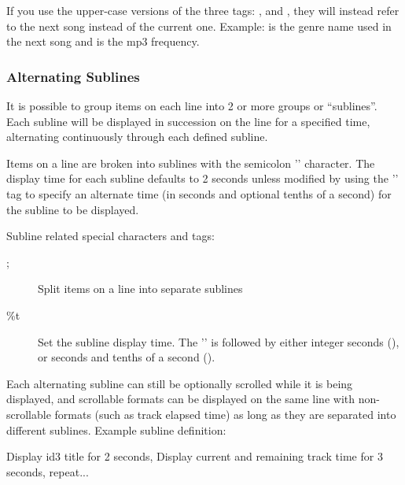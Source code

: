 If you use the upper-case versions of the
three tags: ,  and , they will instead refer to 
the next song instead of the current one. Example:  is the genre 
name used in the next song and  is the mp3 frequency.


\subsubsection{Alternating Sublines}

It is possible to group items on each line into 2 or more groups or 
``sublines''. Each subline will be displayed in succession on the line for a 
specified time, alternating continuously through each defined subline.

Items on a line are broken into sublines with the semicolon
'\config{;}' character. The display time for
each subline defaults to 2 seconds unless modified by using the
'' tag to specify an alternate
time (in seconds and optional tenths of a second) for the subline to be
displayed. 

Subline related special characters and tags: 
\begin{description}
\item[;] Split items on a line into separate sublines
\item[\%t] Set the subline display time. The
'' is followed by either integer
seconds (), or seconds and tenths of a second ().
\end{description}

Each alternating subline can still be optionally scrolled while it is
being displayed, and scrollable formats can be displayed on the same
line with non{}-scrollable formats (such as track elapsed time) as long
as they are separated into different sublines.
Example subline definition:
\begin{example}
                                 Display id3 title for 2 seconds,
                                 Display current and remaining track time
                                 for 3 seconds,
                                 repeat...
\end{example}


